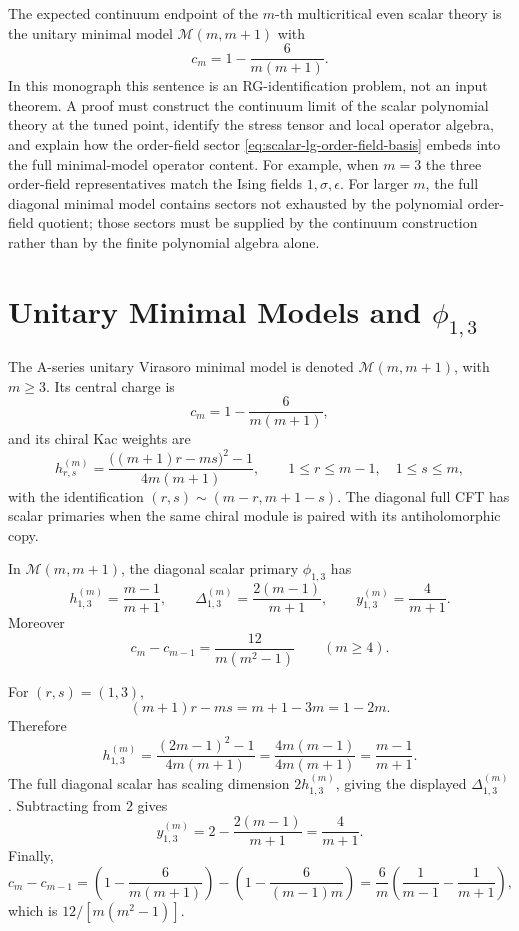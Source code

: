 The expected continuum endpoint of the \(m\)-th multicritical even scalar
theory is the unitary minimal model \(\mathcal M(m,m+1)\) with
\[
  c_m=1-\frac{6}{m(m+1)}.
\]
In this monograph this sentence is an RG-identification problem, not an input
theorem.  A proof must construct the continuum limit of the scalar
polynomial theory at the tuned point, identify the stress tensor and local
operator algebra, and explain how the order-field sector
\eqref{eq:scalar-lg-order-field-basis} embeds into the full minimal-model
operator content.  For example, when \(m=3\) the three order-field
representatives match the Ising fields \(1,\sigma,\epsilon\).  For larger
\(m\), the full diagonal minimal model contains sectors not exhausted by the
polynomial order-field quotient; those sectors must be supplied by the
continuum construction rather than by the finite polynomial algebra alone.

\section{Unitary Minimal Models and \texorpdfstring{\(\phi_{1,3}\)}{phi13}}

The A-series unitary Virasoro minimal model is denoted
\(\mathcal M(m,m+1)\), with \(m\ge3\).  Its central charge is
\[
  c_m=1-\frac{6}{m(m+1)} ,
\]
and its chiral Kac weights are
\[
  h_{r,s}^{(m)}
  =
  \frac{\big((m+1)r-ms\big)^2-1}{4m(m+1)},
  \qquad
  1\le r\le m-1,\quad 1\le s\le m ,
\]
with the identification \((r,s)\sim(m-r,m+1-s)\).  The diagonal full CFT has
scalar primaries when the same chiral module is paired with its
antiholomorphic copy.

\begin{remark}
\label{rem:phi13-minimal-model-data}
In \(\mathcal M(m,m+1)\), the diagonal scalar primary
\(\phi_{1,3}\) has
\[
  h_{1,3}^{(m)}=\frac{m-1}{m+1},
  \qquad
  \Delta_{1,3}^{(m)}=\frac{2(m-1)}{m+1},
  \qquad
  y_{1,3}^{(m)}=\frac{4}{m+1}.
\]
Moreover
\[
  c_m-c_{m-1}=\frac{12}{m(m^2-1)}
  \qquad (m\ge4).
\]
\end{remark}

For \((r,s)=(1,3)\),
\[
  (m+1)r-ms=m+1-3m=1-2m .
\]
Therefore
\[
  h_{1,3}^{(m)}
  =
  \frac{(2m-1)^2-1}{4m(m+1)}
  =
  \frac{4m(m-1)}{4m(m+1)}
  =
  \frac{m-1}{m+1}.
\]
The full diagonal scalar has scaling dimension \(2h_{1,3}^{(m)}\), giving the
displayed \(\Delta_{1,3}^{(m)}\).  Subtracting from \(2\) gives
\[
  y_{1,3}^{(m)}
  =
  2-\frac{2(m-1)}{m+1}
  =
  \frac{4}{m+1}.
\]
Finally,
\[
  c_m-c_{m-1}
  =
  \left(1-\frac{6}{m(m+1)}\right)
  -
  \left(1-\frac{6}{(m-1)m}\right)
  =
  \frac{6}{m}\left(\frac1{m-1}-\frac1{m+1}\right),
\]
which is \(12/[m(m^2-1)]\).

